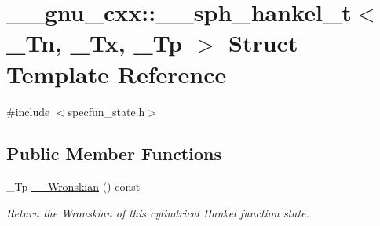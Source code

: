 \hypertarget{struct____gnu__cxx_1_1____sph__hankel__t}{}\section{\+\_\+\+\_\+gnu\+\_\+cxx\+:\+:\+\_\+\+\_\+sph\+\_\+hankel\+\_\+t$<$ \+\_\+\+Tn, \+\_\+\+Tx, \+\_\+\+Tp $>$ Struct Template Reference}
\label{struct____gnu__cxx_1_1____sph__hankel__t}


{\ttfamily \#include $<$specfun\+\_\+state.\+h$>$}

\subsection*{Public Member Functions}
\begin{DoxyCompactItemize}
\item 
\+\_\+\+Tp \hyperlink{struct____gnu__cxx_1_1____sph__hankel__t_a401ba4615906dfc075be66e7048da8c2}{\+\_\+\+\_\+\+Wronskian} () const
\begin{DoxyCompactList}\small\item\em Return the Wronskian of this cylindrical Hankel function state. \end{DoxyCompactList}\end{DoxyCompactItemize}
